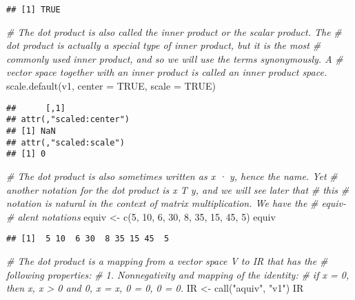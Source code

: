 \documentclass[
]{article}
\newenvironment{Shaded}{\begin{snugshade}}{\end{snugshade}}
\newcommand{\AttributeTok}[1]{\textcolor[rgb]{0.77,0.63,0.00}{#1}}
\newcommand{\CommentTok}[1]{\textcolor[rgb]{0.56,0.35,0.01}{\textit{#1}}}
\newcommand{\ConstantTok}[1]{\textcolor[rgb]{0.00,0.00,0.00}{#1}}
\newcommand{\DecValTok}[1]{\textcolor[rgb]{0.00,0.00,0.81}{#1}}
\newcommand{\FunctionTok}[1]{\textcolor[rgb]{0.00,0.00,0.00}{#1}}
\newcommand{\NormalTok}[1]{#1}
\newcommand{\OtherTok}[1]{\textcolor[rgb]{0.56,0.35,0.01}{#1}}
\newcommand{\StringTok}[1]{\textcolor[rgb]{0.31,0.60,0.02}{#1}}
\begin{document}
\begin{verbatim}
## [1] TRUE
\end{verbatim}

\begin{Shaded}
\begin{Highlighting}[]
\CommentTok{\# The dot product is also called the inner product or the scalar product. The}
\CommentTok{\# dot product is actually a special type of inner product, but it is the most}
\CommentTok{\# commonly used inner product, and so we will use the terms synonymously. A}
\CommentTok{\# vector space together with an inner product is called an inner product space.}
\FunctionTok{scale.default}\NormalTok{(v1, }\AttributeTok{center =} \ConstantTok{TRUE}\NormalTok{, }\AttributeTok{scale =} \ConstantTok{TRUE}\NormalTok{)}
\end{Highlighting}
\end{Shaded}

\begin{verbatim}
##      [,1]
## attr(,"scaled:center")
## [1] NaN
## attr(,"scaled:scale")
## [1] 0
\end{verbatim}

\begin{Shaded}
\begin{Highlighting}[]
\CommentTok{\# The dot product is also sometimes written as x · y, hence the name. Yet}
\CommentTok{\# another notation for the dot product is x T y, and we will see later that }
\CommentTok{\# this}
\CommentTok{\# notation is natural in the context of matrix multiplication. We have the }
\CommentTok{\# equiv{-}}
\CommentTok{\# alent notations}
\NormalTok{equiv }\OtherTok{\textless{}{-}} \FunctionTok{c}\NormalTok{(}\DecValTok{5}\NormalTok{, }\DecValTok{10}\NormalTok{, }\DecValTok{6}\NormalTok{, }\DecValTok{30}\NormalTok{, }\DecValTok{8}\NormalTok{, }\DecValTok{35}\NormalTok{, }\DecValTok{15}\NormalTok{, }\DecValTok{45}\NormalTok{, }\DecValTok{5}\NormalTok{)}
\NormalTok{equiv}
\end{Highlighting}
\end{Shaded}

\begin{verbatim}
## [1]  5 10  6 30  8 35 15 45  5
\end{verbatim}

\begin{Shaded}
\begin{Highlighting}[]
\CommentTok{\# The dot product is a mapping from a vector space V to IR that has the}
\CommentTok{\# following properties:}
\CommentTok{\#  1. Nonnegativity and mapping of the identity:}
\CommentTok{\#  if x = 0, then x, x \textgreater{} 0 and 0, x = x, 0 = 0, 0 = 0.}
\NormalTok{IR }\OtherTok{\textless{}{-}} \FunctionTok{call}\NormalTok{(}\StringTok{"aquiv"}\NormalTok{, }\StringTok{"v1"}\NormalTok{)}
\NormalTok{IR}
\end{Highlighting}
\end{Shaded}
\end{document}
